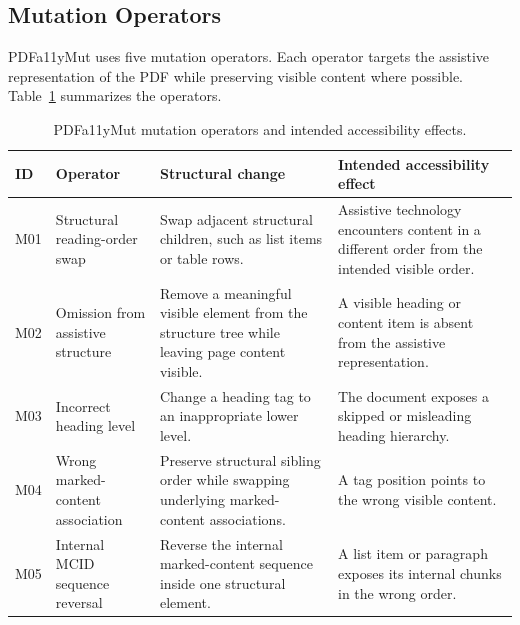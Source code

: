 \documentclass[conference]{IEEEtran}
\begin{document}
\subsection{Mutation Operators}

PDFa11yMut uses five mutation operators. Each operator targets the assistive representation of the PDF while preserving visible content where possible. Table~\ref{tab:operators} summarizes the operators.

\begin{table}[t]
\caption{PDFa11yMut mutation operators and intended accessibility effects.}
\label{tab:operators}
\centering
\small
\begin{tabular}{p{}p{}p{}p{}}
\toprule
ID & Operator & Structural change & Intended accessibility effect \\
\midrule
M01 & Structural reading-order swap & Swap adjacent structural children, such as list items or table rows. & Assistive technology encounters content in a different order from the intended visible order. \\
M02 & Omission from assistive structure & Remove a meaningful visible element from the structure tree while leaving page content visible. & A visible heading or content item is absent from the assistive representation. \\
M03 & Incorrect heading level & Change a heading tag to an inappropriate lower level. & The document exposes a skipped or misleading heading hierarchy. \\
M04 & Wrong marked-content association & Preserve structural sibling order while swapping underlying marked-content associations. & A tag position points to the wrong visible content. \\
M05 & Internal MCID sequence reversal & Reverse the internal marked-content sequence inside one structural element. & A list item or paragraph exposes its internal chunks in the wrong order. \\
\bottomrule
\end{tabular}
\end{table}
\end{document}
